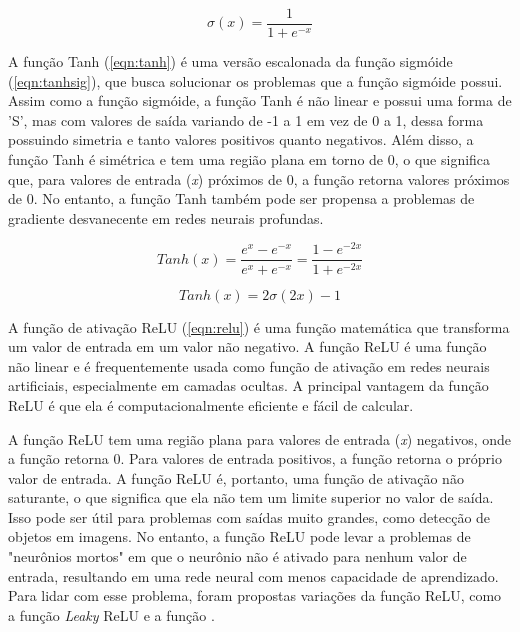     \begin{equation}
    \label{eqn:sig}
    \sigma(x) = \frac{1} {1 + e^{-x}}
    \end{equation}

A função Tanh (\autoref{eqn:tanh}) é uma versão escalonada da função sigmóide (\autoref{eqn:tanhsig}), que busca solucionar os problemas que a função sigmóide possui.
Assim como a função sigmóide, a função Tanh é não linear e possui uma forma de 'S', mas com valores de saída variando de -1 a 1 em vez de 0 a 1, dessa forma possuindo simetria e tanto valores positivos quanto negativos.
Além disso, a função Tanh é simétrica e tem uma região plana em torno de 0, o que significa que, para valores de entrada (\textit{x}) próximos de 0, a função retorna valores próximos de 0.
No entanto, a função Tanh também pode ser propensa a problemas de gradiente desvanecente em redes neurais profundas.
    
\begin{equation}
\label{eqn:tanh}
Tanh(x) = \frac{e^x - e^{-x}}{e^x + e^{-x}} = \frac{1 - e^{-2x}}{1 + e^{-2x}}
\end{equation}

\begin{equation}
\label{eqn:tanhsig}
Tanh(x) = 2\sigma(2x) - 1
\end{equation}

A função de ativação ReLU (\autoref{eqn:relu}) é uma função matemática que transforma um valor de entrada em um valor não negativo.
A função ReLU é uma função não linear e é frequentemente usada como função de ativação em redes neurais artificiais, especialmente em camadas ocultas. 
A principal vantagem da função ReLU é que ela é computacionalmente eficiente e fácil de calcular.

A função ReLU tem uma região plana para valores de entrada (\textit{x}) negativos, onde a função retorna 0. 
Para valores de entrada positivos, a função retorna o próprio valor de entrada. 
A função ReLU é, portanto, uma função de ativação não saturante, o que significa que ela não tem um limite superior no valor de saída. 
Isso pode ser útil para problemas com saídas muito grandes, como detecção de objetos em imagens.
No entanto, a função ReLU pode levar a problemas de "neurônios mortos" em que o neurônio não é ativado para nenhum valor de entrada, resultando em uma rede neural com menos capacidade de aprendizado. 
Para lidar com esse problema, foram propostas variações da função ReLU, como a função \textit{Leaky} ReLU e a função .


